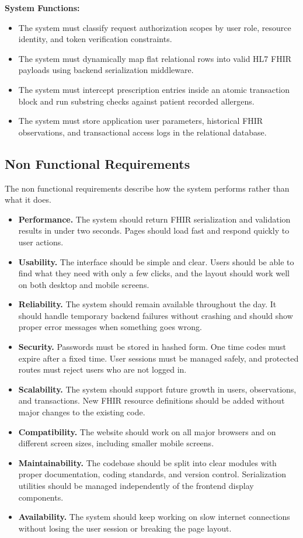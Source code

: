 \documentclass[12pt, a4paper]{report}
\numberwithin{equation}{chapter}
\begin{document}
\noindent \textbf{System Functions:}
\begin{itemize}
    \item The system must classify request authorization scopes by user role, resource identity, and token verification constraints.
    \item The system must dynamically map flat relational rows into valid HL7 FHIR payloads using backend serialization middleware.
    \item The system must intercept prescription entries inside an atomic transaction block and run substring checks against patient recorded allergens.
    \item The system must store application user parameters, historical FHIR observations, and transactional access logs in the relational database.
\end{itemize}

\subsection{Non Functional Requirements}
The non functional requirements describe how the system performs rather than what it does.
\begin{itemize}
    \item \textbf{Performance.} The system should return FHIR serialization and validation results in under two seconds. Pages should load fast and respond quickly to user actions.
    \item \textbf{Usability.} The interface should be simple and clear. Users should be able to find what they need with only a few clicks, and the layout should work well on both desktop and mobile screens.
    \item \textbf{Reliability.} The system should remain available throughout the day. It should handle temporary backend failures without crashing and should show proper error messages when something goes wrong.
    \item \textbf{Security.} Passwords must be stored in hashed form. One time codes must expire after a fixed time. User sessions must be managed safely, and protected routes must reject users who are not logged in.
    \item \textbf{Scalability.} The system should support future growth in users, observations, and transactions. New FHIR resource definitions should be added without major changes to the existing code.
    \item \textbf{Compatibility.} The website should work on all major browsers and on different screen sizes, including smaller mobile screens.
    \item \textbf{Maintainability.} The codebase should be split into clear modules with proper documentation, coding standards, and version control. Serialization utilities should be managed independently of the frontend display components.
    \item \textbf{Availability.} The system should keep working on slow internet connections without losing the user session or breaking the page layout.
\end{itemize}
\end{document}
